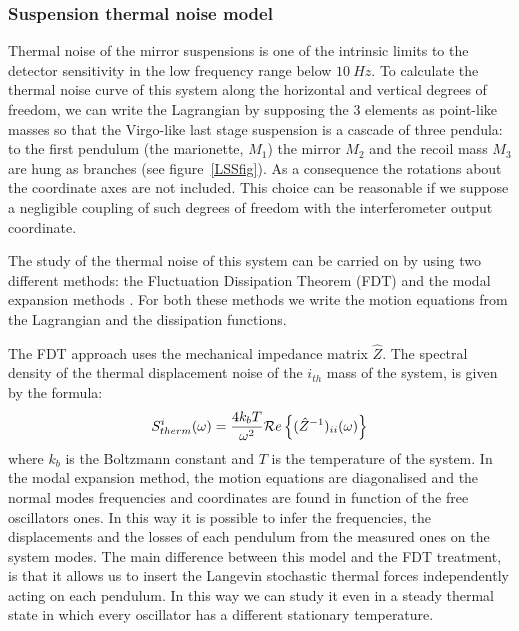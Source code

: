 \subsubsection{Suspension thermal noise model}
\label{sec:thermal_noise}


Thermal noise of the mirror suspensions is one of the intrinsic limits to the detector sensitivity in the low frequency range below $10 \ Hz$.
To calculate the thermal noise curve of this system along the horizontal and vertical degrees of freedom, we can write the 
Lagrangian by supposing the 3 elements as point-like masses so that the Virgo-like last stage suspension is a cascade of three pendula:  
 to the first pendulum (the marionette, $M_1$) the mirror $M_2$ and the recoil mass $M_3$ are hung as branches (see figure~\ref{LSSfig}). 
As a consequence the rotations about the coordinate axes are not included.  This choice can be reasonable if we suppose a 
negligible coupling of such degrees of freedom with the interferometer output coordinate. 

The study of the thermal noise of this system can be carried on by using two different methods: 
the Fluctuation Dissipation Theorem (FDT)  and the modal expansion methods \cite{PPP2009,ThModal}. 
For both these methods we write the motion equations from the Lagrangian and the dissipation functions. 

The FDT approach uses the mechanical impedance matrix $\hat{Z}$. The spectral density of the thermal displacement noise of the $i_{th}$ 
mass of the system, is given by the formula:
\begin{equation}
S_{therm}^i(\omega)=\frac{4 k_b T}{\omega^2}  {\cal{R}}e\left\{(\hat{Z}^{-1})_{ii}(\omega)\right\}
\label{eq_FDT}
\end{equation}
where $k_b$ is the Boltzmann constant and $T$ is the temperature of the system.
In the modal expansion method, the motion equations are diagonalised and the normal modes frequencies and coordinates are found in function of the free oscillators ones.
In this way it is possible to infer the frequencies, the displacements and the losses of each pendulum from the measured ones on the system modes. 
The main difference between this model and the FDT treatment, is that it allows us to insert the Langevin stochastic thermal forces independently acting on 
each pendulum. In this way we can study it even in a steady thermal state in which every oscillator has a different stationary temperature. 

